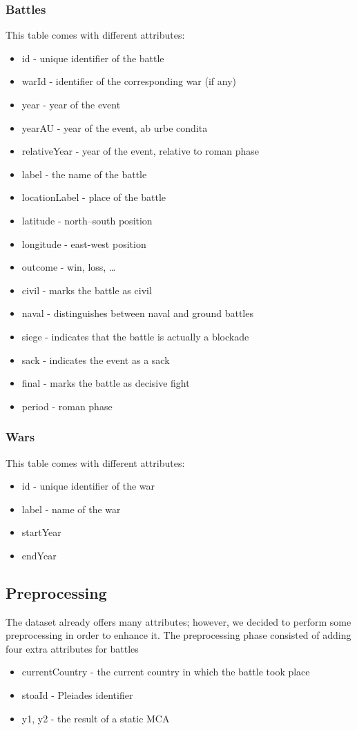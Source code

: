 \subsubsection{Battles}
This table comes with different attributes:
\begin{itemize}
    \item id - unique identifier of the battle
    \item warId - identifier of the corresponding war (if any)
    \item year - year of the event
    \item yearAU - year of the event, ab urbe condita
    \item relativeYear - year of the event, relative to roman phase
    \item label - the name of the battle
    \item locationLabel - place of the battle
    \item latitude - north–south position
    \item longitude - east-west position
    \item outcome - win, loss, \dots
    \item civil - marks the battle as civil
    \item naval - distinguishes between naval and ground battles
    \item siege - indicates that the battle is actually a blockade
    \item sack - indicates the event as a sack
    \item final - marks the battle as decisive fight
    \item period - roman phase
\end{itemize}

\subsubsection{Wars}
This table comes with different attributes:
\begin{itemize}
    \item id - unique identifier of the war
    \item label - name of the war
    \item startYear
    \item endYear
\end{itemize}

\subsection{Preprocessing}
The dataset already offers many attributes; however, we decided to perform some preprocessing in order to enhance it. The preprocessing phase consisted of adding four extra attributes for battles
\begin{itemize}
    \item currentCountry - the current country in which the battle took place
    \item stoaId - Pleiades identifier
    \item y1, y2 - the result of a static MCA
\end{itemize}

